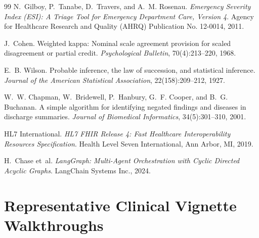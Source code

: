 \documentclass[11pt,a4paper]{article}
\begin{document}
\newpage
\begin{thebibliography}{99}
N.~Gilboy, P.~Tanabe, D.~Travers, and A.~M. Rosenau.
\newblock \emph{Emergency Severity Index (ESI): A Triage Tool for Emergency Department Care, Version 4}.
\newblock Agency for Healthcare Research and Quality (AHRQ) Publication No. 12-0014, 2011.

J.~Cohen.
\newblock Weighted kappa: Nominal scale agreement provision for scaled disagreement or partial credit.
\newblock \emph{Psychological Bulletin}, 70(4):213--220, 1968.

E.~B. Wilson.
\newblock Probable inference, the law of succession, and statistical inference.
\newblock \emph{Journal of the American Statistical Association}, 22(158):209--212, 1927.

W.~W. Chapman, W.~Bridewell, P.~Hanbury, G.~F. Cooper, and B.~G. Buchanan.
\newblock A simple algorithm for identifying negated findings and diseases in discharge summaries.
\newblock \emph{Journal of Biomedical Informatics}, 34(5):301--310, 2001.

HL7 International.
\newblock \emph{HL7 FHIR Release 4: Fast Healthcare Interoperability Resources Specification}.
\newblock Health Level Seven International, Ann Arbor, MI, 2019.

H.~Chase et~al.
\newblock \emph{LangGraph: Multi-Agent Orchestration with Cyclic Directed Acyclic Graphs}.
\newblock LangChain Systems Inc., 2024.
\end{thebibliography}

\newpage
\appendix
\section{Representative Clinical Vignette Walkthroughs}
\end{document}
